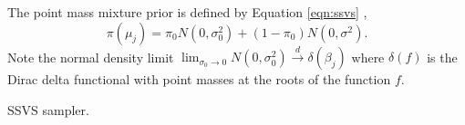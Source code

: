 The point mass mixture prior is defined by Equation \ref{eqn:ssvs} \cite{george1993variable},
\begin{equation}\label{eqn:ssvs_appendix}
\pi(\mu_j) = \pi_0N(0, \sigma_0^2) +(1-\pi_0)N(0, \sigma^2).
\end{equation}
Note the normal density limit $\lim_{\sigma_0 \to 0} N(0, \sigma_0^2) \overset{d}{\to} \delta(\beta_j)$ where $\delta(f)$ is the Dirac delta functional with point masses at the roots of the function $f$. 
					
			\begin{algorithm}[H]
{}
\caption{SSVS sampler.}\label{psd:SSVS_sampler}
			\end{algorithm}
